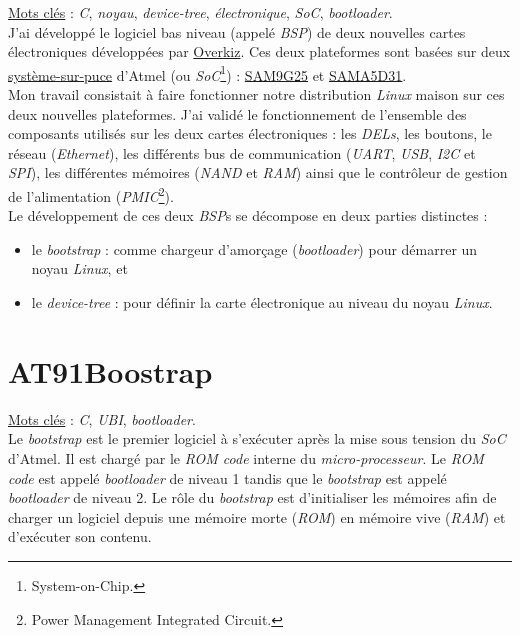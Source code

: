 \documentclass[a4paper]{article}
\begin{document}
\underline{Mots clés} : \textit{C}, \textit{noyau}, \textit{device-tree}, \textit{électronique}, \textit{SoC}, \textit{bootloader}.\\

J'ai développé le logiciel bas niveau (appelé \textit{BSP}) de deux nouvelles cartes électroniques développées par \href{http://www.overkiz.com/}{Overkiz}. Ces deux plateformes sont basées sur deux \href{https://fr.wikipedia.org/wiki/Syst\%C3\%A8me_sur_une_puce}{système-sur-puce} d'Atmel (ou \textit{SoC}\footnote{System-on-Chip.}) : \href{http://www.atmel.com/devices/SAM9G25.aspx}{SAM9G25} et \href{http://www.atmel.com/products/microcontrollers/arm/sama5.aspx}{SAMA5D31}.\\

Mon travail consistait à faire fonctionner notre distribution \textit{Linux} maison sur ces deux nouvelles plateformes. J'ai validé le fonctionnement de l'ensemble des composants utilisés sur les deux cartes électroniques : les \textit{DELs}, les boutons, le réseau (\textit{Ethernet}), les différents bus de communication (\textit{UART}, \textit{USB}, \textit{I2C} et \textit{SPI}), les différentes mémoires (\textit{NAND} et \textit{RAM}) ainsi que le contrôleur de gestion de l'alimentation (\textit{PMIC}\footnote{Power Management Integrated Circuit.}).\\

Le développement de ces deux \textit{BSP}s se décompose en deux parties distinctes :
\begin{itemize}
\item le \textit{bootstrap} : comme chargeur d'amorçage (\textit{bootloader}) pour démarrer un noyau \textit{Linux}, et
\item le \textit{device-tree} : pour définir la carte électronique au niveau du noyau \textit{Linux}.
\end{itemize}

\section{AT91Boostrap}

\underline{Mots clés} : \textit{C}, \textit{UBI}, \textit{bootloader}.\\

Le \textit{bootstrap} est le premier logiciel à s’exécuter après la mise sous tension du \textit{SoC} d'Atmel. Il est chargé par le \textit{ROM code} interne du \textit{micro-processeur}. Le \textit{ROM code} est appelé \textit{bootloader} de niveau 1 tandis que le \textit{bootstrap} est appelé \textit{bootloader} de niveau 2. Le rôle du \textit{bootstrap} est d’initialiser les mémoires afin de charger un logiciel depuis une mémoire morte (\textit{ROM}) en mémoire vive (\textit{RAM}) et d’exécuter son contenu. \\
\end{document}
